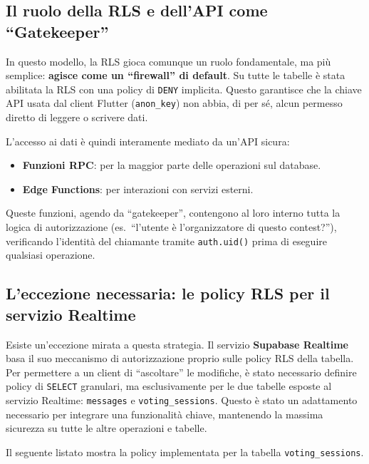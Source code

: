 \subsection{Il ruolo della RLS e dell'API come ``Gatekeeper''}\label{subsec:il-ruolo-della-rls-e-dell'api-come-gatekeeper}
In questo modello, la RLS gioca comunque un ruolo fondamentale, ma più semplice: \textbf{agisce come un ``firewall'' di default}.
Su tutte le tabelle è stata abilitata la RLS con una policy di \texttt{DENY} implicita.
Questo garantisce che la chiave API usata dal client Flutter (\texttt{anon\_key}) non abbia, di per sé, alcun permesso diretto di leggere o scrivere dati.

L'accesso ai dati è quindi interamente mediato da un'API sicura:
\begin{itemize}
    \item \textbf{Funzioni RPC}: per la maggior parte delle operazioni sul database.
    \item \textbf{Edge Functions}: per interazioni con servizi esterni.
\end{itemize}
Queste funzioni, agendo da ``gatekeeper'', contengono al loro interno tutta la logica di autorizzazione (es.\ ``l'utente è l'organizzatore di questo contest?''), verificando l'identità del chiamante tramite \texttt{auth.uid()} prima di eseguire qualsiasi operazione.

\subsection{L'eccezione necessaria: le policy RLS per il servizio Realtime}\label{subsec:l'eccezione-necessaria:-le-policy-rls-per-il-servizio-realtime}
Esiste un'eccezione mirata a questa strategia.
Il servizio \textbf{Supabase Realtime} basa il suo meccanismo di autorizzazione proprio sulle policy RLS della tabella.
Per permettere a un client di ``ascoltare'' le modifiche, è stato necessario definire policy di \texttt{SELECT} granulari, ma esclusivamente per le due tabelle esposte al servizio Realtime: \texttt{messages} e \texttt{voting\_sessions}.
Questo è stato un adattamento necessario per integrare una funzionalità chiave, mantenendo la massima sicurezza su tutte le altre operazioni e tabelle.

Il seguente listato mostra la policy implementata per la tabella \texttt{voting\_sessions}.

